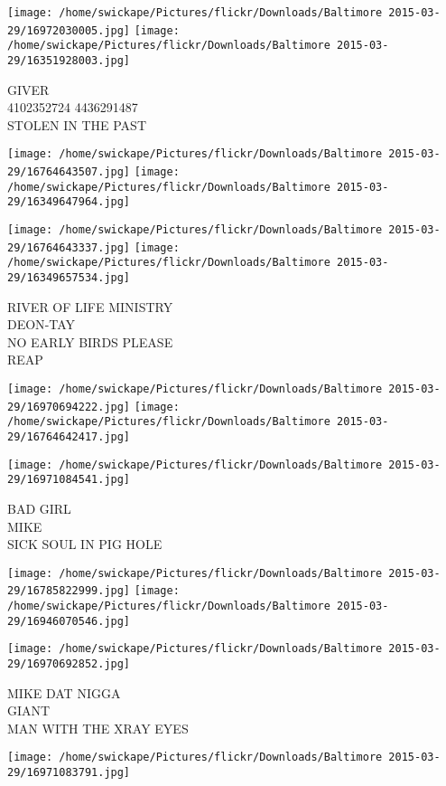 \documentclass[10pt,letterpaper]{article}
\begin{document}
\vspace{0.25in}
\texttt{[image: /home/swickape/Pictures/flickr/Downloads/Baltimore 2015-03-29/16972030005.jpg]}
\texttt{[image: /home/swickape/Pictures/flickr/Downloads/Baltimore 2015-03-29/16351928003.jpg]}

GIVER\\
4102352724 4436291487\\
STOLEN IN THE PAST
\pagebreak

\texttt{[image: /home/swickape/Pictures/flickr/Downloads/Baltimore 2015-03-29/16764643507.jpg]}
\texttt{[image: /home/swickape/Pictures/flickr/Downloads/Baltimore 2015-03-29/16349647964.jpg]}

\texttt{[image: /home/swickape/Pictures/flickr/Downloads/Baltimore 2015-03-29/16764643337.jpg]}
\texttt{[image: /home/swickape/Pictures/flickr/Downloads/Baltimore 2015-03-29/16349657534.jpg]}

RIVER OF LIFE MINISTRY\\
DEON{-}TAY\\
NO EARLY BIRDS PLEASE\\
REAP
\pagebreak

\texttt{[image: /home/swickape/Pictures/flickr/Downloads/Baltimore 2015-03-29/16970694222.jpg]}
\texttt{[image: /home/swickape/Pictures/flickr/Downloads/Baltimore 2015-03-29/16764642417.jpg]}

\vspace{0.25in}
\texttt{[image: /home/swickape/Pictures/flickr/Downloads/Baltimore 2015-03-29/16971084541.jpg]}

BAD GIRL\\
MIKE\\
SICK SOUL IN PIG HOLE
\pagebreak

\texttt{[image: /home/swickape/Pictures/flickr/Downloads/Baltimore 2015-03-29/16785822999.jpg]}
\texttt{[image: /home/swickape/Pictures/flickr/Downloads/Baltimore 2015-03-29/16946070546.jpg]}

\vspace{0.25in}
\texttt{[image: /home/swickape/Pictures/flickr/Downloads/Baltimore 2015-03-29/16970692852.jpg]}

MIKE DAT NIGGA\\
GIANT\\
MAN WITH THE XRAY EYES
\pagebreak

\texttt{[image: /home/swickape/Pictures/flickr/Downloads/Baltimore 2015-03-29/16971083791.jpg]}
\end{document}
